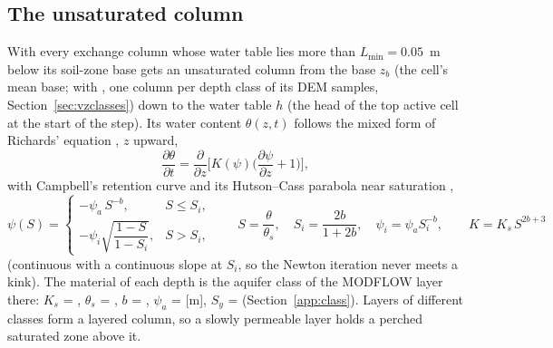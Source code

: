 \subsection{The unsaturated column}\label{sec:szvadose}
With  every exchange column whose water table lies more than
$L_{\min}=0.05$~m below its soil-zone base gets an unsaturated column from the base $z_b$ (the cell's mean base; with
, one column per depth class of its DEM samples, Section~\ref{sec:vzclasses}) down to the
water table $h$ (the head of the top active cell at the start of the step). Its water content $\theta(z,t)$ follows
the mixed form of Richards' equation \cite{celia1990}, $z$ upward,
\begin{equation}
\frac{\partial\theta}{\partial t}=\frac{\partial}{\partial z}\Big[K(\psi)\Big(\frac{\partial\psi}{\partial z}+1\Big)\Big],
\end{equation}
with Campbell's retention curve \cite{campbell1974} and its Hutson--Cass parabola near saturation \cite{hutson1987},
\begin{equation}
\psi(S)=\begin{cases}-\psi_a\,S^{-b}, & S\le S_i,\\[2pt] -\psi_i\sqrt{\dfrac{1-S}{1-S_i}}, & S>S_i,\end{cases}\qquad
S=\frac{\theta}{\theta_s},\quad S_i=\frac{2b}{1+2b},\quad \psi_i=\psi_a S_i^{-b},\qquad K=K_s\,S^{2b+3}
\end{equation}
(continuous with a continuous slope at $S_i$, so the Newton iteration never meets a kink). The material of each depth
is the aquifer class of the MODFLOW layer there: $K_s$ = , $\theta_s$ = , $b$ = ,
$\psi_a$ =  [m], $S_y$ =  (Section~\ref{app:class}). Layers of different
classes form a layered column, so a slowly permeable layer holds a perched saturated zone above it.

